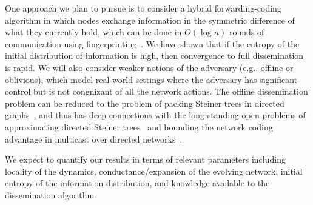 One approach we plan to pursue is to consider a hybrid
forwarding-coding algorithm in which nodes exchange information in the
symmetric difference of what they currently hold, which can be done in
$O(\log n)$ rounds of communication using
fingerprinting~\cite{mitzenmacher-2005-fastmixing}.  We have shown
that if the entropy of the initial distribution of information
is high, then convergence to full dissemination is rapid.  We will
also consider weaker notions of the adversary (e.g., offline or
oblivious), which model real-world settings where the adversary has
significant control but is not congnizant of all the network actions.
The offline dissemination problem can be reduced to the problem of
packing Steiner trees in directed
graphs~\cite{cheriyan+s:steiner,dutta+prs:dynamic}, and thus has deep
connections with the long-standing open problems of approximating
directed Steiner
trees~\cite{charikar+ccdgg:steiner,halperin+k:steiner,zosin+k:steiner}
and bounding the network coding advantage in multicast over directed
networks~\cite{agarwal+c:coding,sanders+et:flow}.

We expect to quantify our results in terms of relevant parameters
including locality of the dynamics, conductance/expansion of the
evolving network, initial entropy of the information distribution, and
knowledge available to the dissemination algorithm.  
\iffalse***** Repeats last para
We have also
shown that the dissemination problem can be reduced to the problem of
packing Steiner trees in directed graphs, and thus has deep
connections with the long-standing open problems of approximating
directed Steiner trees~\cite{charikar+ccdgg:steiner} and bounding the
network coding advantage in multicast over directed networks.
\fi

